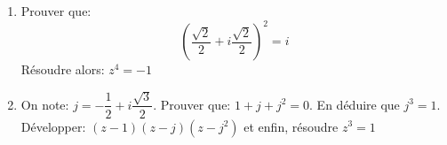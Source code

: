 \begin{exercice}
\begin{enumerate}
  \item Prouver que:
\[ \left(\frac{\sqrt2}{2}+i \frac{\sqrt2}{2}\right)^2=i \]
R\'esoudre alors: $z^4=-1$
\item On note: $j=-\dfrac{1}{2}+i \dfrac{\sqrt3}{2}$. Prouver que:
  $1+j+j^2=0$. En d\'eduire que $j^3=1$. D\'evelopper: $(z-1)(z-j)(z-j^2)$ et enfin, r\'esoudre $z^3=1$

\end{enumerate}
  
\end{exercice}
